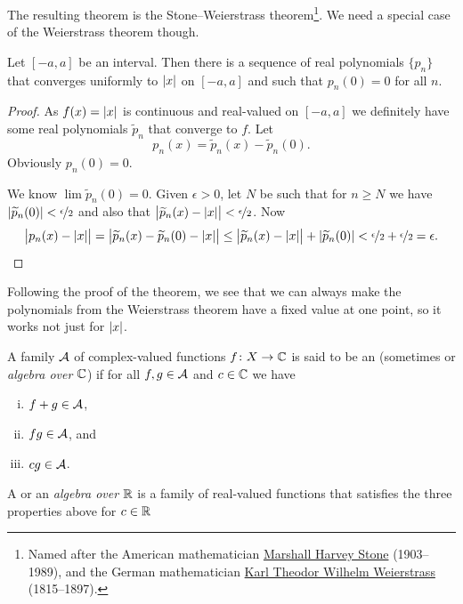 The resulting theorem is the Stone--Weierstrass theorem\footnote{%
Named after the American mathematician
\href{http://en.wikipedia.org/wiki/Marshall_Harvey_Stone}{Marshall Harvey Stone}
(1903--1989), and the German mathematician
\href{http://en.wikipedia.org/wiki/Karl_Weierstrass}{Karl Theodor Wilhelm Weierstrass}
(1815--1897).}.
We need a
special case of the Weierstrass theorem though.

\begin{cor}
Let $[-a,a]$ be an interval.  Then there is a sequence of real polynomials
$\{ p_n \}$ that converges uniformly to $\lvert {x} \rvert$ on $[-a,a]$ and such that
$p_n(0) = 0$ for all $n$.
\end{cor}

\begin{proof}
As $f(x) = \lvert {x} \rvert$ is continuous and real-valued
on $[-a,a]$ we definitely have some
real polynomials $\widetilde{p}_n$ that converge to $f$.
Let
\begin{equation*}
p_n(x) = \widetilde{p}_n(x) - \widetilde{p}_n(0) .
\end{equation*}
Obviously $p_n(0) = 0$.

We know
$\lim \widetilde{p}_n(0) = 0$.  Given $\epsilon > 0$, let $N$ be such that
for $n \geq N$ we have $\lvert {\widetilde{p}_n(0)} \rvert < \nicefrac{\epsilon}{2}$
and also that $\bigl\lvert\widetilde{p}_n(x)-\lvert {x} \rvert\big\rvert < \nicefrac{\epsilon}{2}$.
Now
\begin{equation*}
\bigl\lvert p_n(x)-\lvert {x} \rvert \bigr\rvert
=
\bigl\lvert \widetilde{p}_n(x) - \widetilde{p}_n(0) - \lvert {x} \rvert \bigr\rvert
\leq
\bigl\lvert \widetilde{p}_n(x) - \lvert {x} \rvert \bigr\rvert + \lvert {\widetilde{p}_n(0)} \rvert < 
\nicefrac{\epsilon}{2} + \nicefrac{\epsilon}{2} = \epsilon . \qedhere
\end{equation*}
\end{proof}

Following the proof of the theorem,
we see that we can always make the polynomials from the Weierstrass theorem
have a fixed value at one point, so it works not just for $\lvert {x} \rvert$.

\begin{defn}
A family ${\mathcal{A}}$ of complex-valued functions $f \colon X \to {\mathbb{C}}$ is said to be an 
\emph{} (sometimes
\emph{} or \emph{algebra over ${\mathbb{C}}$}) if for all $f, g \in {\mathcal{A}}$ and $c \in {\mathbb{C}}$ we have
\begin{enumerate}[(i)]
\item $f+g \in {\mathcal{A}}$,
\item $fg \in {\mathcal{A}}$, and
\item $cg \in {\mathcal{A}}$.
\end{enumerate}
A \emph{} or an
\emph{algebra over ${\mathbb{R}}$} is a family of real-valued
functions that satisfies the three properties above for $c \in {\mathbb{R}}$
\end{defn}

